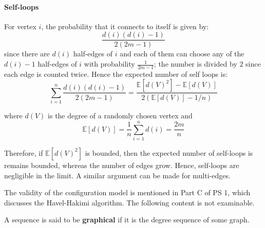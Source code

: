 \documentclass{article}
\begin{document}
\paragraph{Self-loops} For vertex $i$, the probability that it connects to itself is given by:
\begin{equation*}
    \frac{d(i) (d(i)-1)}{2(2m-1)}
\end{equation*}
since there are $d(i)$ half-edges of $i$ and each of them can choose any of the $d(i)-1$ half-edges of $i$ with probability $\frac{1}{2m-1}$; the number is divided by $2$ since each edge is counted twice.  Hence the expected number of self loops is:
\begin{equation*}
    \sum_{i=1}^{n}\frac{d(i)(d(i)-1)}{2(2m-1)}=\frac{\mathbb{E}[d(V)^{2}]-\mathbb{E}[d(V)]}{2(\mathbb{E}[d(V)]-1/n)}
\end{equation*}

where $d(V)$ is the degree of a randomly chosen vertex and 
\begin{equation*}
    \mathbb{E}[d(V)] = \frac{1}{n} \sum_{i=1}^{n} d(i) = \frac{2m}{n}
\end{equation*}

Therefore, if $\mathbb{E}[d(V)^{2}]$ is bounded, then the expected number of self-loops is remains bounded, whereas the number of edges grow. Hence, self-loops are negligible in the limit. A similar argument can be made for multi-edges.  

\begin{unexaminable}
    The validity of the configuration model is mentioned in Part C of PS 1, which discusses the Havel-Hakimi algorithm. The following content is not examinable.
\end{unexaminable}

\begin{definition}
    A sequence is said to be \textbf{graphical} if it is the degree sequence of some graph.
\end{definition}
\end{document}
